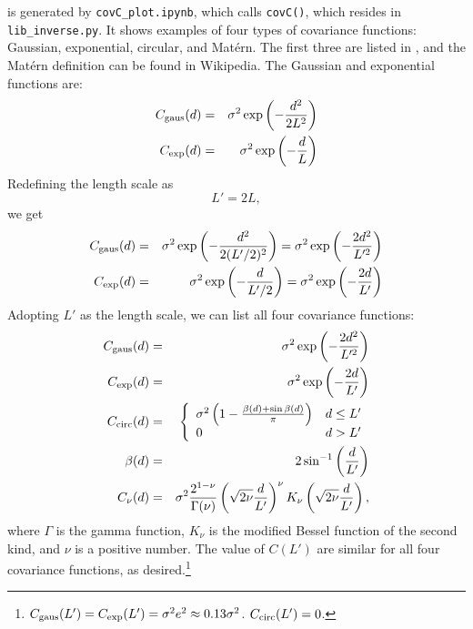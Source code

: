 \documentclass[11pt,titlepage,fleqn]{article}
\newcommand{\cfile}{{\tt covC\_plot.ipynb}}
\begin{document}
 is generated by \cfile, which calls \verb+covC()+, which resides in \verb+lib_inverse.py+. It shows examples of four types of covariance functions: Gaussian, exponential, circular, and Mat\'ern. The first three are listed in \citet[][p.~111-113]{Tarantola2005}, and the Mat\'ern definition can be found in Wikipedia. The Gaussian and exponential functions are:
%
\begin{eqnarray}
C_{\rm gaus}(d) &=& \sigma^2 \exp \left( - \frac{ d^2}{2L^2} \right)
\label{Cgaus0}
\\
C_{\rm exp}(d) &=& \sigma^2 \exp \left( - \frac{d}{L} \right)
\label{Cexp0}
\end{eqnarray}
%
Redefining the length scale as
%
\begin{equation}
L' = 2L,
\end{equation}
%
we get
%
\begin{eqnarray*}
C_{\rm gaus}(d) &=& \sigma^2 \exp \left( - \frac{ d^2}{2(L'/2)^2} \right) 
= \sigma^2 \exp \left( - \frac{2 d^2}{L'^2} \right) 
\\
C_{\rm exp}(d) &=& \sigma^2 \exp \left( - \frac{d}{L'/2} \right)
= \sigma^2 \exp \left( - \frac{2 d}{L'} \right)
\end{eqnarray*}
%
Adopting $L'$ as the length scale, we can list all four covariance functions:
%
\begin{eqnarray}
C_{\rm gaus}(d) &=& \sigma^2 \exp \left( - \frac{2 d^2}{L'^2} \right) 
\label{Cgaus1}
\\
C_{\rm exp}(d) &=& \sigma^2 \exp \left( - \frac{2 d}{L'} \right)
\label{Cexp1}
\\
C_{\rm circ}(d) &=& \left\{
\begin{array}{ll}
\sigma^2\left(1 - \frac{\beta(d) + \sin\beta(d)}{\pi} \right) & d \le L'
\\
0 \;\;\;\; & d > L'
\end{array}
\right.
\\
\beta(d) &=& 2 \sin^{-1}\left( \frac{d}{L'} \right)
\nonumber
\\
C_\nu(d) &=& \sigma^2 \frac{2^{1-\nu}}{\Gamma(\nu)} \left(\sqrt{2\nu}\frac{d}{L'} \right)^\nu K_\nu\left(\sqrt{2\nu} \frac{d}{L'}\right),
\end{eqnarray}
%
where $\Gamma$ is the gamma function, $K_\nu$ is the modified Bessel function of the second kind, and $\nu$ is a positive number. The value of $C(L')$ are similar for all four covariance functions, as desired.\footnote{$C_{\rm gaus}(L') = C_{\rm exp}(L') = \sigma^2e^2 \approx 0.13\sigma^2$. $C_{\rm circ}(L') = 0$.}
\end{document}
